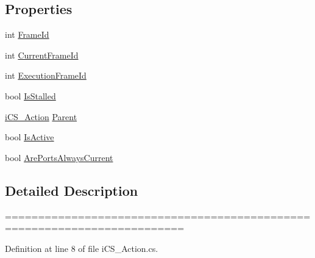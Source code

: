 \subsection*{Properties}
\begin{DoxyCompactItemize}
\item 
int \hyperlink{classi_c_s___action_aa290a19c510c8b2eced2c7e00d204647}{Frame\+Id}
\item 
int \hyperlink{classi_c_s___action_a97659af385187584ff04da8b5f6ecbac}{Current\+Frame\+Id}
\item 
int \hyperlink{classi_c_s___action_aa2ca65dac75b45974698e8f50b706457}{Execution\+Frame\+Id}
\item 
bool \hyperlink{classi_c_s___action_aad70f9d06727a67c8eb5b7b318609f36}{Is\+Stalled}
\item 
\hyperlink{classi_c_s___action}{i\+C\+S\+\_\+\+Action} \hyperlink{classi_c_s___action_a027cf604231c4e3df565a6f5b5e04b3c}{Parent}
\item 
bool \hyperlink{classi_c_s___action_ab5b67f53c94c5c6905769a05d93a80fe}{Is\+Active}
\item 
bool \hyperlink{classi_c_s___action_a622e9e76d092de28ae0e99f0e61eb054}{Are\+Ports\+Always\+Current}
\end{DoxyCompactItemize}


\subsection{Detailed Description}
========================================================================= 

Definition at line 8 of file i\+C\+S\+\_\+\+Action.\+cs.



